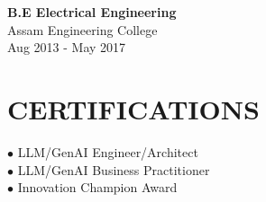 \documentclass[letterpaper,11pt]{article}
\begin{document}
\begin{minipage}[t]{0.33\textwidth}
{\begin{minipage}{\textwidth}
\textbf{\small B.E Electrical Engineering} \\
\textcolor{mediumgray}{\footnotesize Assam Engineering College} \\
\textcolor{mediumgray}{\footnotesize Aug 2013 - May 2017}

\vspace{10pt}
\section{CERTIFICATIONS}
\vspace{2pt}
\color{darktext}\footnotesize
$\bullet$ LLM/GenAI Engineer/Architect \\
$\bullet$ LLM/GenAI Business Practitioner \\
$\bullet$ Innovation Champion Award

\vspace{8pt}
\end{minipage}
}
\end{minipage}%
\hfill
\end{document}
